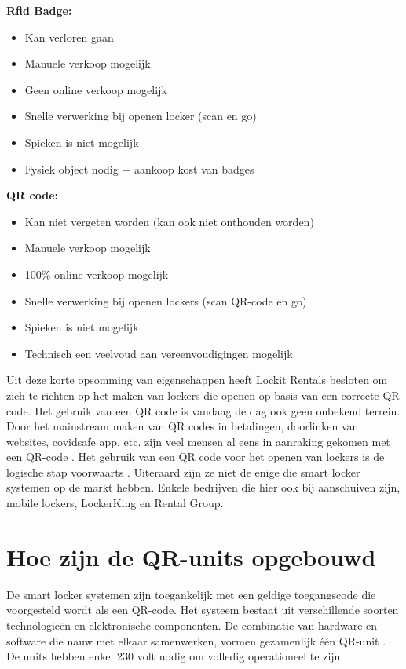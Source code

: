 \textbf{Rfid Badge:}
\begin{itemize}
    \item Kan verloren gaan
    \item Manuele verkoop mogelijk
    \item Geen online verkoop mogelijk
    \item Snelle verwerking bij openen locker (scan en go)
    \item Spieken is niet mogelijk
    \item Fysiek object nodig + aankoop kost van badges    
\end{itemize}

\textbf{QR  code:}
\begin{itemize}
    \item Kan niet vergeten worden (kan ook niet onthouden worden)
    \item Manuele verkoop mogelijk
    \item 100\% online verkoop mogelijk
    \item Snelle verwerking bij openen lockers (scan QR-code en go)
    \item Spieken is niet mogelijk
    \item Technisch een veelvoud aan vereenvoudigingen mogelijk    
\end{itemize}

Uit deze korte opsomming van eigenschappen heeft Lockit Rentals besloten om zich te richten op het maken van lockers die openen op basis van een correcte QR code. Het gebruik van een QR code is vandaag de dag ook geen onbekend terrein. Door het mainstream maken van QR codes in betalingen, doorlinken van websites, covidsafe app, etc. zijn veel mensen al eens in aanraking gekomen met een QR-code \autocite{Belle2023}. Het gebruik van een QR code voor het openen van lockers is de logische stap voorwaarts \autocite{Lo2014}.
Uiteraard zijn ze niet de enige die smart locker systemen op de markt hebben. Enkele bedrijven die hier ook bij aanschuiven zijn, mobile lockers, LockerKing en Rental Group.

\section{Hoe zijn de QR-units opgebouwd}%
\label{sec:QR-units}
De smart locker systemen zijn toegankelijk met een geldige toegangscode die voorgesteld wordt als een QR-code. Het systeem bestaat uit verschillende soorten technologieën en elektronische componenten. De combinatie van hardware en software die nauw met elkaar samenwerken, vormen gezamenlijk één QR-unit \autocite{Jadhav2016} . De units hebben enkel 230 volt nodig om volledig operationeel te zijn. 

